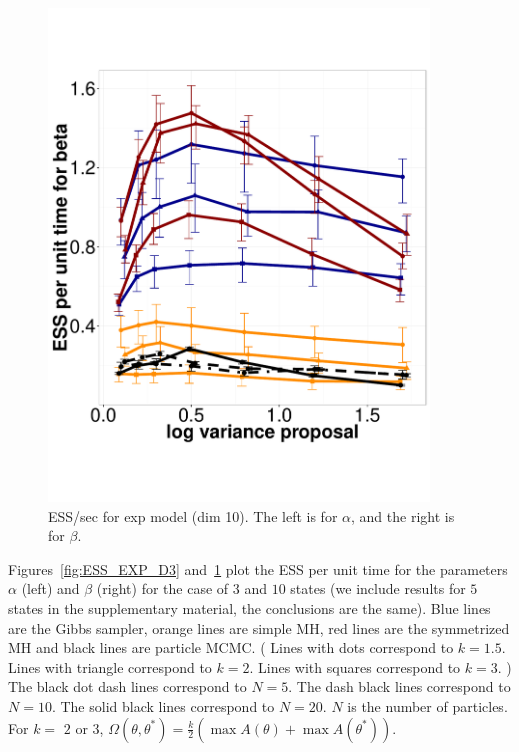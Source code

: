 \begin{figure}
\begin{minipage}[hp]{0.45\linewidth}
    \includegraphics [width=0.90\textwidth, angle=0]{figs/exp_10_beta.pdf}
    \vspace{-0 in}
  \end{minipage}
    \caption{ESS/sec for exp model (dim 10). The left is for $\alpha$, and the right is for $\beta$.}
     \label{fig:ESS_EXP_D10}
  \end{figure}
  Figures~\ref{fig:ESS_EXP_D3} and~\ref{fig:ESS_EXP_D10} plot the ESS 
  per unit time for the parameters $\alpha$ (left) and $\beta$ (right) for the
  case of $3$ and $10$ states (we include results for $5$ states in the 
  supplementary material, the conclusions are the same). 
  Blue lines are the Gibbs sampler, orange lines are simple MH, red lines 
are the symmetrized MH and black lines are particle MCMC. 
(
{\color{red} Lines with dots correspond to $k = 1.5$. 
Lines with triangle correspond to $k = 2$. 
Lines with squares correspond to $k = 3$.  )
The black dot dash lines correspond to $N  = 5$. 
The dash black lines correspond to $N  = 10$. 
The solid black lines correspond to $N  = 20$. $N$ is the number of particles. 
For $k=$ $2$ or $3$, $\Omega(\theta, \theta^*) = 
\frac{k}{2} (\max A(\theta) + \max A(\theta^*))$. }

